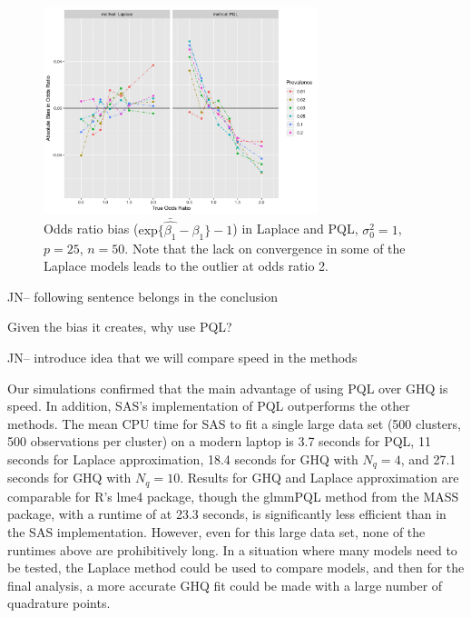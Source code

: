 \documentclass{article}
\begin{document}
\begin{flushleft}
\begin{figure}[]
\begin{center}
\includegraphics[width=8cm]{_bias_pql_lap.png}
  \caption{Odds ratio bias ($\text{exp} \{ \bar{\hat{\beta_1}} - \beta_1 \} - 1$) in Laplace and PQL, $\sigma^2_0=1$, $p=25$, $n=50$. Note that the lack on convergence in some of the Laplace models leads to the outlier at odds ratio 2.}
  \label{fig:_bias_pql_lap}
\end{center}
\end{figure}


JN-- following sentence belongs in the conclusion

Given the bias it creates, why use PQL? 

JN-- introduce idea that we will compare speed in the methods

Our simulations confirmed that the main advantage of using PQL over GHQ is speed.  In addition, SAS's implementation of PQL outperforms the other methods. The mean CPU time for SAS to fit a single large data set (500 clusters, 500 observations per cluster) on a modern laptop is 3.7 seconds for PQL, 11 seconds for Laplace approximation, 18.4 seconds for GHQ with $N_q=4$, and 27.1 seconds for GHQ with $N_q=10$. Results for GHQ and Laplace approximation are comparable for R's lme4 package, though the glmmPQL method from the MASS package, with a runtime of at 23.3 seconds, is significantly less efficient than in the SAS implementation. However, even for this large data set, none of the runtimes above are prohibitively long. In a situation where many models need to be tested, the Laplace method could be used to compare models, and then for the final analysis, a more accurate GHQ fit could be made with a large number of quadrature points.



\end{flushleft}
\end{document}
